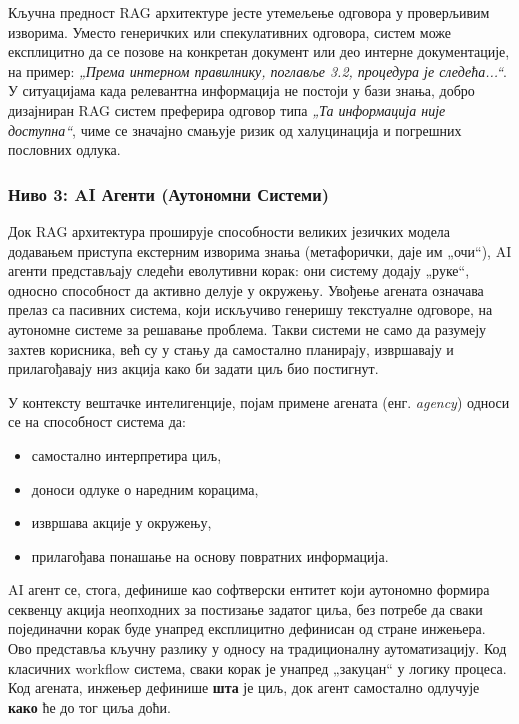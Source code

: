 \begin{tcolorbox}[colback=yellow!10!white,colframe=orange!75!black,title=Предност RAG-а: Утемељење (Grounding)]
Кључна предност RAG архитектуре јесте утемељење одговора у проверљивим изворима.
Уместо генеричких или спекулативних одговора, систем може експлицитно да се позове
на конкретан документ или део интерне документације, на пример:
\textit{„Према интерном правилнику, поглавље 3.2, процедура је следећа...“}.
У ситуацијама када релевантна информација не постоји у бази знања,
добро дизајниран RAG систем преферира одговор типа \textit{„Та информација није доступна“},
чиме се значајно смањује ризик од халуцинација и погрешних пословних одлука.


\end{tcolorbox}

\subsubsection*{Ниво 3: AI Агенти (Аутономни Системи)}

Док RAG архитектура проширује способности великих језичких модела додавањем
приступа екстерним изворима знања (метафорички, даје им „очи“),
AI агенти представљају следећи еволутивни корак: они систему додају „руке“,
односно способност да активно делује у окружењу.
Увођење агената означава прелаз са пасивних система, који искључиво генеришу
текстуалне одговоре, на аутономне системе за решавање проблема.
Такви системи не само да разумеју захтев корисника,
већ су у стању да самостално планирају, извршавају и прилагођавају низ акција
како би задати циљ био постигнут.

У контексту вештачке интелигенције, појам примене агената (енг. \textit{agency})
односи се на способност система да:
\begin{itemize}
    \item самостално интерпретира циљ,
    \item доноси одлуке о наредним корацима,
    \item извршава акције у окружењу,
    \item прилагођава понашање на основу повратних информација.
\end{itemize}

AI агент се, стога, дефинише као софтверски ентитет који аутономно
формира секвенцу акција неопходних за постизање задатог циља,
без потребе да сваки појединачни корак буде унапред експлицитно дефинисан од стране инжењера.
Ово представља кључну разлику у односу на традиционалну аутоматизацију.
Код класичних workflow система, сваки корак је унапред „закуцан“ у логику процеса.
Код агената, инжењер дефинише \textbf{шта} је циљ,
док агент самостално одлучује \textbf{како} ће до тог циља доћи.

